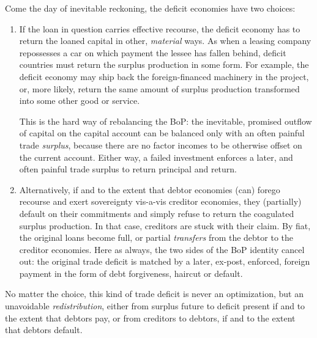 \documentclass[11pt,a4paper,oneside,openright]{article}
\begin{document}
\begin{description}
\begin{enumerate}
		Come the day of inevitable reckoning, the deficit economies have two choices:
		\begin{enumerate}
			\item If the loan in question carries effective recourse, the deficit economy has to return the loaned capital in other, \emph{material} ways. 
			As when a leasing company repossesses a car on which payment the lessee has fallen behind, deficit countries must return the surplus production in some form. 
			For example, the deficit economy may ship back the foreign-financed machinery in the project, or, more likely, return the same amount of surplus production transformed into some other good or service. 
			
			This is the hard way of rebalancing the \gls{BoP}: 
			the inevitable, promised outflow of capital on the capital account can be balanced only with an often painful trade \emph{surplus}, because there are no factor incomes to be otherwise offset on the current account. 
			Either way, a failed investment enforces a later, and often painful trade surplus to return principal and return.

			\item Alternatively, if and to the extent that debtor economies (can) forego recourse and exert sovereignty vis-a-vis creditor economies, they (partially) default on their commitments and simply refuse to return the coagulated surplus production. 
			In that case, creditors are stuck with their claim. 
			By fiat, the original loans become full, or partial \emph{transfers} from the debtor to the creditor economies. 
			Here as always, the two sides of the \gls{BoP} identity cancel out: 
			the original trade deficit is matched by a later, ex-post, enforced, foreign payment in the form of debt forgiveness, haircut or default.
		\end{enumerate}

		No matter the choice, this kind of trade deficit is never an optimization, but an unavoidable \emph{redistribution}, either from surplus future to deficit present if and to the extent that debtors pay, or from creditors to debtors, if and to the extent that debtors default.
		

\end{enumerate}
\end{description}
\end{document}
